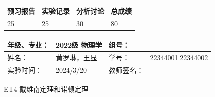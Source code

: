 \documentclass[dvipsnames, svgnames,a4paper,11pt]{article}
\begin{document}
	
	\begin{table}
		\renewcommand\arraystretch{1.7}
		\begin{tabularx}{\textwidth}{
				|X|X|X|X
				|X|X|X|X|}
			\hline
			\multicolumn{2}{|c|}{预习报告}&\multicolumn{2}{|c|}{实验记录}&\multicolumn{2}{|c|}{分析讨论}&\multicolumn{2}{|c|}{总成绩}\\
			\hline
			\LARGE25 & & \LARGE25 & & \LARGE30 & & \LARGE80 & \\
			\hline
		\end{tabularx}
	\end{table}
	
		\begin{table}
		\renewcommand\arraystretch{1.7}
		\begin{tabularx}{\textwidth}{|X|X|X|X|}
			\hline
			年级、专业： & 2022级 物理学 &组号： & \\
			\hline
			姓名： &  黄罗琳，王显  & 学号： &22344001 22344002   \\
			\hline
			实验时间： & 2024/3/20 & 教师签名： & \\
			\hline
		\end{tabularx}
	\end{table}
	
	\begin{center}
	\LARGE ET4 \quad 戴维南定理和诺顿定理
	\end{center}
	
	
\end{document}
